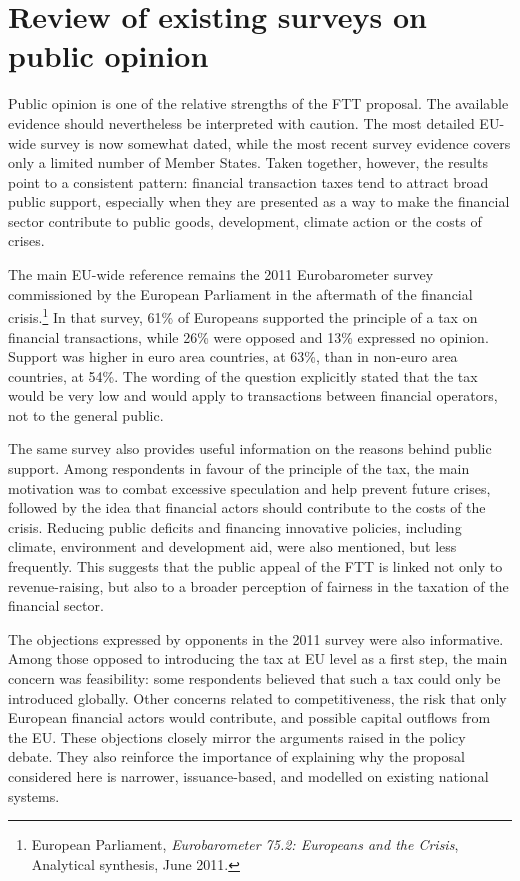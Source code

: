 \documentclass[../main]{subfiles}
\begin{document}
\section{Review of existing surveys on public opinion}

Public opinion is one of the relative strengths of the FTT proposal. The available evidence should nevertheless be interpreted with caution. The most detailed EU-wide survey is now somewhat dated, while the most recent survey evidence covers only a limited number of Member States. Taken together, however, the results point to a consistent pattern: financial transaction taxes tend to attract broad public support, especially when they are presented as a way to make the financial sector contribute to public goods, development, climate action or the costs of crises.

The main EU-wide reference remains the 2011 Eurobarometer survey commissioned by the European Parliament in the aftermath of the financial crisis.\footnote{European Parliament, \textit{Eurobarometer 75.2: Europeans and the Crisis}, Analytical synthesis, June 2011.} In that survey, 61\% of Europeans supported the principle of a tax on financial transactions, while 26\% were opposed and 13\% expressed no opinion. Support was higher in euro area countries, at 63\%, than in non-euro area countries, at 54\%. The wording of the question explicitly stated that the tax would be very low and would apply to transactions between financial operators, not to the general public.

The same survey also provides useful information on the reasons behind public support. Among respondents in favour of the principle of the tax, the main motivation was to combat excessive speculation and help prevent future crises, followed by the idea that financial actors should contribute to the costs of the crisis. Reducing public deficits and financing innovative policies, including climate, environment and development aid, were also mentioned, but less frequently. This suggests that the public appeal of the FTT is linked not only to revenue-raising, but also to a broader perception of fairness in the taxation of the financial sector.

The objections expressed by opponents in the 2011 survey were also informative. Among those opposed to introducing the tax at EU level as a first step, the main concern was feasibility: some respondents believed that such a tax could only be introduced globally. Other concerns related to competitiveness, the risk that only European financial actors would contribute, and possible capital outflows from the EU. These objections closely mirror the arguments raised in the policy debate. They also reinforce the importance of explaining why the proposal considered here is narrower, issuance-based, and modelled on existing national systems.
\end{document}
